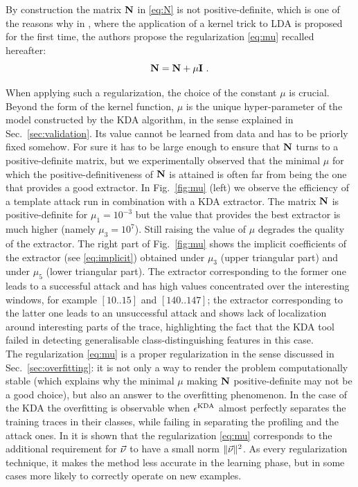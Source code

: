 By construction the matrix $\textbf{N}$ in \eqref{eq:N} is not positive-definite, which is one of the reasons why in \cite{scholkopf1999fisher}, where the application of a kernel trick to LDA is proposed for the first time, the authors propose the regularization \eqref{eq:mu} recalled hereafter:
\begin{equation}
\textbf{N} = \textbf{N} + \mu\textbf{I} \mbox{ .}
\end{equation}

When applying such a regularization, the choice of the constant $\mu$ is crucial. Beyond the form of the kernel function, $\mu$ is the unique hyper-parameter of the model constructed by the KDA algorithm, in the sense explained in Sec.~\ref{sec:validation}. Its value cannot be learned from data and has to be priorly fixed somehow. For sure it has to be large enough to ensure that $\textbf{N}$ turns to a positive-definite matrix, but we experimentally observed  that the minimal $\mu$ for which the positive-definitiveness of $\textbf{N}$ is attained is often far from  being the one that provides a good extractor. In Fig.~\ref{fig:mu} (left) we observe the efficiency of a template attack run in combination with a KDA extractor. The matrix $\textbf{N}$ is positive-definite for $\mu_1 = 10^{-3}$ but the value that provides the best extractor is much higher (namely $\mu_3 = 10^{7}$). Still raising the value of $\mu$ degrades the quality of the extractor. The right part of Fig.~\ref{fig:mu} shows the implicit coefficients of the extractor (see \eqref{eq:implicit}) obtained under $\mu_3$ (upper triangular part) and under $\mu_5$ (lower triangular part). The extractor corresponding to the former one leads to a successful attack and has high values concentrated over the interesting windows, for example $[10..15]$ and $[140..147]$; the extractor corresponding to the latter one leads to an unsuccessful attack and shows lack of localization around interesting parts of the trace, highlighting the fact that the KDA tool failed in detecting generalisable class-distinguishing features in this case.\\

The regularization \eqref{eq:mu} is a proper regularization in the sense discussed in Sec.~\ref{sec:overfitting}: it is not only a way to render the problem computationally stable (which explains why the minimal $\mu$ making $\textbf{N}$ positive-definite may not be a good choice), but also an answer to the overfitting phenomenon. In the case of the KDA the overfitting is observable when $\epsilon^{\mathrm{KDA}}$ almost perfectly separates the training traces in their classes, while failing in separating the profiling and the attack ones. In \cite{scholkopf1999fisher} it is shown that the regularization \eqref{eq:mu} corresponds to the additional requirement for $\vec{\nu}$ to have a small norm $\lVert\vec{\nu}\rVert^2$. As every regularization technique, it makes the method less accurate in the learning phase, but in some cases more likely to correctly operate on new examples.

